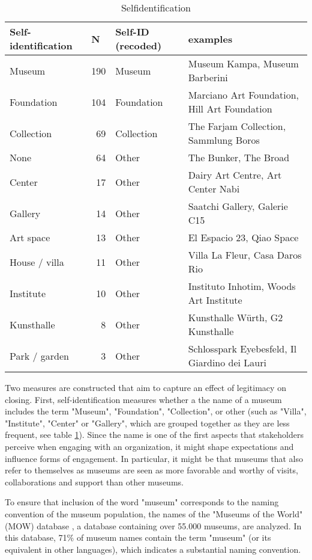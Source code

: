 \documentclass[12pt]{article}
\begin{document}
\begin{table}[ht]
\centering
\begin{tabular}{lrll}
  \hline 
 \multicolumn{1}{l}{Self-identification} & \multicolumn{1}{l}{N} & \multicolumn{1}{l}{Self-ID (recoded)} & \multicolumn{1}{l}{examples}\\ 
 \hline
 Museum & 190 & Museum & Museum Kampa, Museum Barberini \\ 
  Foundation & 104 & Foundation & Marciano Art Foundation, Hill Art Foundation \\ 
  Collection &  69 & Collection & The Farjam Collection, Sammlung Boros \\ 
  None &  64 & Other & The Bunker, The Broad \\ 
  Center &  17 & Other & Dairy Art Centre, Art Center Nabi \\ 
  Gallery &  14 & Other & Saatchi Gallery, Galerie C15 \\ 
  Art space &  13 & Other & El Espacio 23, Qiao Space \\ 
  House / villa &  11 & Other & Villa La Fleur, Casa Daros Rio \\ 
  Institute &  10 & Other & Instituto Inhotim, Woods Art Institute \\ 
  Kunsthalle &   8 & Other & Kunsthalle Würth, G2 Kunsthalle \\ 
  Park / garden &   3 & Other & Schlosspark Eyebesfeld, Il Giardino dei Lauri \\ 
   \hline
\end{tabular}
\caption{Selfidentification} 
\label{tbl:t_selfid}
\end{table}

Two measures are constructed that aim to capture an effect of legitimacy on closing.
First, self-identification measures whether a the name of a museum includes the term "Museum", "Foundation", "Collection", or other (such as "Villa", "Institute", "Center" or "Gallery", which are grouped together as they are less frequent, see table \ref{tbl:t_selfid}).
Since the name is one of the first aspects that stakeholders perceive when engaging with an organization, it might shape expectations and influence forms of engagement.
In particular, it might be that museums that also refer to themselves as museums are seen as more favorable and worthy of visits, collaborations and support than other museums.


To ensure that inclusion of the word "museum" corresponds to the naming convention of the museum population, the names of the "Museums of the World" (MOW) database \parencite{deGruyter_2021_MOW}, a database containing over 55.000 museums, are analyzed.
In this database, 71\% of museum names contain the term "museum" (or its equivalent in other languages), which indicates a substantial naming convention. 
\end{document}

